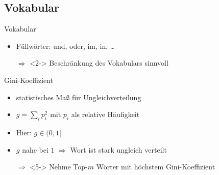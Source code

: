 \subsection{Vokabular}
\begin{frame}{Vokabular}
    \begin{itemize}
        \item<1-> Füllwörter: und, oder, im, in, \dots
        \item[$\Rightarrow$]<2-> Beschränkung des Vokabulars sinnvoll
    \end{itemize}

\end{frame}

\begin{frame}{Gini-Koeffizient}
    \begin{itemize}
        \item<1-> statistisches Maß für Ungleichverteilung
        \item<2-> $g = \sum_i p_i^2$ mit $p_i$ als relative Häufigkeit
        \item<3-> Hier: $g \in (0, 1]$
        \item<4-> $g$ nahe bei $1$ $\Rightarrow$ Wort ist stark ungleich verteilt
        \item[$\Rightarrow$]<5-> Nehme Top-$m$ Wörter mit höchstem
                  Gini-Koeffizient
    \end{itemize}
\end{frame}

